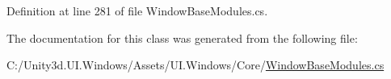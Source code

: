 Definition at line 281 of file Window\+Base\+Modules.\+cs.



The documentation for this class was generated from the following file\+:\begin{DoxyCompactItemize}
\item 
C\+:/\+Unity3d.\+U\+I.\+Windows/\+Assets/\+U\+I.\+Windows/\+Core/\hyperlink{_window_base_modules_8cs}{Window\+Base\+Modules.\+cs}\end{DoxyCompactItemize}
